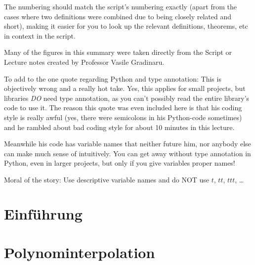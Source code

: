 \documentclass{article}
\begin{document}
The numbering should match the script's numbering exactly (apart from the cases where two definitions were combined due to being closely related and short), making it easier for you to look up the relevant definitions, theorems, etc in context in the script.

Many of the figures in this summary were taken directly from the Script or Lecture notes created by Professor Vasile Gradinaru.

To add to the one quote regarding Python and type annotation: This is objectively wrong and a really hot take.
Yes, this applies for small projects, but libraries \textit{DO} need type annotation, as you can't possibly read the entire library's code to use it.
The reason this quote was even included here is that his coding style is really awful (yes, there were semicolons in his Python-code sometimes)
and he rambled about bad coding style for about 10 minutes in this lecture.

Meanwhile his code has variable names that neither future him, nor anybody else can make much sense of intuitively.
You can get away without type annotation in Python, even in larger projects, but only if you give variables proper names!

Moral of the story: Use descriptive variable names and do NOT use $t$, $tt$, $ttt$, \dots



\newsection
\section{Einführung}




\newsection
\section{Polynominterpolation}





\end{document}

